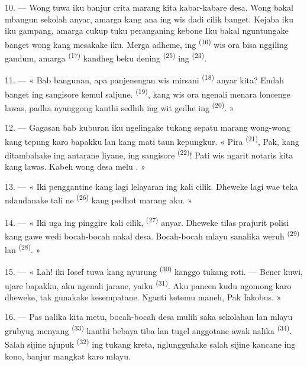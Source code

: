 \VUsaut{3.0mm}

10. --- Wong tuwa iku banjur crita marang kita kabar-kabare desa. Wong
bakal mbangun sekolah anyar, amarga kang ana ing 
wis dadi cilik banget. Kejaba iku iku gampang, amarga cukup tuku
peranganing kebone  Iku bakal nguntungake
banget wong kang mesakake iku. Merga adheme,  ing
 \textsuperscript{(16)} wis ora bisa nggiling
gandum, amarga  \textsuperscript{(17)} kandheg beku
dening  \textsuperscript{(25)} ing 
\textsuperscript{(23)}.

11. --- « Bab bangunan, apa panjenengan wis mirsani 
\textsuperscript{(18)} anyar kita? Endah banget ing sangisore kemul
saljune.  \textsuperscript{(19)}, kang wis ora
ngenali menara loncenge lawas, padha nyanggong kanthi sedhih ing wit
gedhe ing  \textsuperscript{(20)}. »

12. --- Gagasan bab kuburan iku ngelingake tukang sepatu marang
wong-wong kang tepung karo bapakku lan kang mati taun kepungkur.
« Pira  \textsuperscript{(21)}, Pak, kang ditambahake ing
antarane liyane, ing sangisore 
\textsuperscript{(22)}! Pati wis ngarit notaris kita kang lawas. Kabeh
wong desa melu . »

13. --- « Iki penggantine kang lagi lelayaran ing kali cilik. Dheweke
lagi wae teka ndandanake tali ne
\textsuperscript{(26)} kang pedhot marang aku. »

14. --- « Iki uga ing pinggire kali cilik, 
\textsuperscript{(27)} anyar. Dheweke tilas prajurit polisi kang gawe
wedi bocah-bocah nakal desa. Bocah-bocah mlayu sanalika weruh
 \textsuperscript{(29)} lan 
\textsuperscript{(28)}. »

15. --- « Lah! iki Iosef tuwa kang nyurung  \textsuperscript{(30)} kanggo tukang roti. --- Bener
kuwi, ujare bapakku, aku ngenali jarane, yaiku 
\textsuperscript{(31)}. Aku pancen kudu ngomong karo dheweke, tak
gunakake kesempatane. Nganti ketemu maneh, Pak Iakobus. »

16. --- Pas nalika kita metu, bocah-bocah desa mulih saka sekolahan lan
mlayu grubyug menyang  \textsuperscript{(33)}
kanthi bebaya tiba lan tugel anggotane awak nalika 
\textsuperscript{(34)}. Salah sijine njupuk 
\textsuperscript{(32)} ing tukang kreta, nglungguhake salah sijine
kancane ing kono, banjur mangkat karo mlayu.

